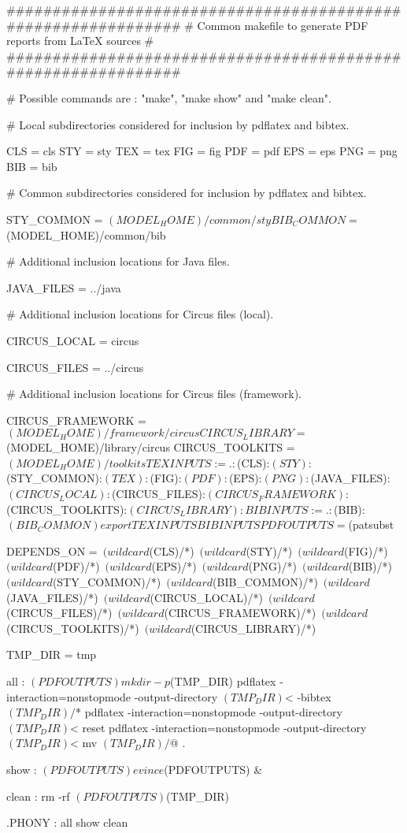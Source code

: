 ##############################################################
# Common makefile to generate PDF reports from LaTeX sources #
##############################################################

# Possible commands are : "make", "make show" and "make clean".

# Local subdirectories considered for inclusion by pdflatex and bibtex.

CLS = cls
STY = sty
TEX = tex
FIG = fig
PDF = pdf
EPS = eps
PNG = png
BIB = bib

# Common subdirectories considered for inclusion by pdflatex and bibtex.

STY_COMMON = $(MODEL_HOME)/common/sty
BIB_COMMON = $(MODEL_HOME)/common/bib

# Additional inclusion locations for Java files.

JAVA_FILES = ../java

# Additional inclusion locations for Circus files (local).

CIRCUS_LOCAL = circus

CIRCUS_FILES = ../circus

# Additional inclusion locations for Circus files (framework).

CIRCUS_FRAMEWORK = $(MODEL_HOME)/framework/circus
CIRCUS_LIBRARY   = $(MODEL_HOME)/library/circus
CIRCUS_TOOLKITS  = $(MODEL_HOME)/toolkits

TEXINPUTS := .:$(CLS):$(STY):$(STY_COMMON):$(TEX):$(FIG):$(PDF):$(EPS):$(PNG):$(JAVA_FILES):$(CIRCUS_LOCAL):$(CIRCUS_FILES):$(CIRCUS_FRAMEWORK):$(CIRCUS_TOOLKITS):$(CIRCUS_LIBRARY):

BIBINPUTS := .:$(BIB):$(BIB_COMMON)

export TEXINPUTS BIBINPUTS

PDFOUTPUTS =$(patsubst %

DEPENDS_ON =\
$(wildcard $(CLS)/*)\
$(wildcard $(STY)/*)\
$(wildcard $(FIG)/*)\
$(wildcard $(PDF)/*)\
$(wildcard $(EPS)/*)\
$(wildcard $(PNG)/*)\
$(wildcard $(BIB)/*)\
$(wildcard $(STY_COMMON)/*)\
$(wildcard $(BIB_COMMON)/*)\
$(wildcard $(JAVA_FILES)/*)\
$(wildcard $(CIRCUS_LOCAL)/*)\
$(wildcard $(CIRCUS_FILES)/*)\
$(wildcard $(CIRCUS_FRAMEWORK)/*)\
$(wildcard $(CIRCUS_TOOLKITS)/*)\
$(wildcard $(CIRCUS_LIBRARY)/*)

TMP_DIR = tmp

all : $(PDFOUTPUTS)

	mkdir -p $(TMP_DIR)
	pdflatex -interaction=nonstopmode -output-directory $(TMP_DIR) $<
	-bibtex $(TMP_DIR)/$*
	pdflatex -interaction=nonstopmode -output-directory $(TMP_DIR) $<
	reset
	pdflatex -interaction=nonstopmode -output-directory $(TMP_DIR) $<
	mv $(TMP_DIR)/$@ .

show : $(PDFOUTPUTS)
	evince $(PDFOUTPUTS) &

clean :
	rm -rf $(PDFOUTPUTS) $(TMP_DIR)

.PHONY : all show clean
